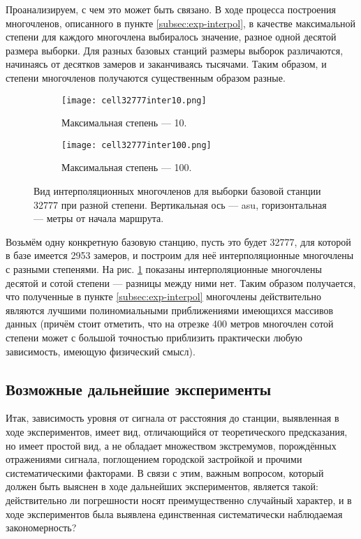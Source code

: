 Проанализируем, с чем это может быть связано. В ходе процесса построения многочленов, описанного в пункте \ref{subsec:exp-interpol}, в качестве максимальной степени для каждого многочлена выбиралось значение, разное одной десятой размера выборки. Для разных базовых станций размеры выборок различаются, начинаясь от десятков замеров и заканчиваясь тысячами. Таким образом, и степени многочленов получаются существенным образом разные.

\begin{figure}[h]
	\begin{center}
		\begin{subfigure}[b]{0.45\textwidth}
			\texttt{[image: cell32777inter10.png]}
			\caption{Максимальная степень --- 10.}
		\end{subfigure}
		\begin{subfigure}[b]{0.45\textwidth}
			\texttt{[image: cell32777inter100.png]}
			\caption{Максимальная степень --- 100.}
		\end{subfigure}
	\end{center}
	\caption{Вид интерполяционных многочленов для выборки базовой станции 32777 при разной степени. Вертикальная ось --- asu, горизонтальная --- метры от начала маршрута.}
	\label{fig:exp-cell-order}
\end{figure}
Возьмём одну конкретную базовую станцию, пусть это будет 32777, для которой в базе имеется 2953 замеров, и построим для неё интерполяционные многочлены с разными степенями. На рис. \ref{fig:exp-cell-order} показаны интерполяционные многочлены десятой и сотой степени --- разницы между ними нет. Таким образом получается, что полученные в пункте \ref{subsec:exp-interpol} многочлены действительно являются лучшими полиномиальными приближениями имеющихся массивов данных (причём стоит отметить, что на отрезке 400 метров многочлен сотой степени может с большой точностью приблизить практически любую зависимость, имеющую физический смысл).

\subsection{Возможные дальнейшие эксперименты}
Итак, зависимость уровня от сигнала от расстояния до станции, выявленная в ходе экспериментов, имеет вид, отличающийся от теоретического предсказания, но имеет простой вид, а не обладает множеством экстремумов, порождённых отражениями сигнала, поглощением городской застройкой и прочими систематическими факторами. В связи с этим, важным вопросом, который должен быть выяснен в ходе дальнейших экспериментов, является такой: действительно ли погрешности носят преимущественно случайный характер, и в ходе экспериментов была выявлена единственная систематически наблюдаемая закономерность?

